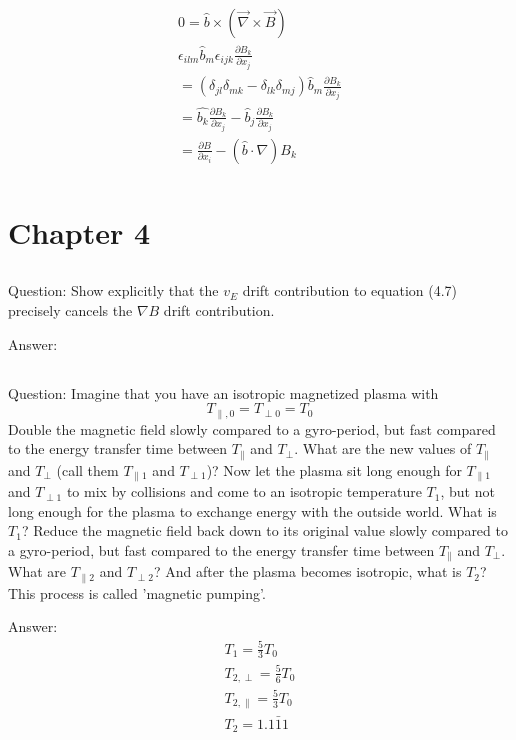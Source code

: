 \documentclass{article}
\begin{document}
\begin{eqnarray*}
    0=\hat{b}\times(\vec{\nabla}\times \vec{B})\\
    \epsilon_{ilm}\hat{b}_m\epsilon_{ijk}\frac{\partial B_k}{\partial x_j}\\
    =(\delta_{jl}\delta_{mk}-\delta_{lk}\delta_{mj})\hat{b}_m\frac{\partial B_k}{\partial x_j}\\
    =\hat{b_k}\frac{\partial B_k}{\partial x_j}-\hat{b}_j\frac{\partial B_k}{\partial x_j}\\
    =\frac{\partial B}{\partial x_i}-(\hat{b}\cdot\nabla)B_k\\
\end{eqnarray*}

\section{Chapter 4}
\subsection{}
Question: Show explicitly that the $v_E$ drift contribution to equation (4.7) precisely cancels the $\nabla B$ drift contribution.

Answer:

\subsection{}
Question: Imagine that you have an isotropic magnetized plasma with 
\begin{equation}
    T_{\parallel,0}=T_{\perp 0}=T_0
\end{equation}
Double the magnetic field slowly compared to a gyro-period, but fast compared to the energy transfer time between $T_\parallel$ and $T_\perp$. 
What are the new values of $T_\parallel$ and $T_\perp$ (call them $T_{\parallel 1}$ and $T_{\perp 1}$)? Now let the plasma sit long enough for $T_{\parallel 1}$ and $T_{\perp 1}$ to mix
by collisions and come to an isotropic temperature $T_1$, but not long enough for the plasma to exchange energy with the outside world. What is $T_1$? Reduce the magnetic field back down to its original 
value slowly compared to a gyro-period, but fast compared to the energy transfer time between $T_{\parallel}$ and $T_\perp$. What are $T_{\parallel 2}$ and $T_{\perp 2}$? And after the plasma becomes isotropic, what is 
$T_2$? This process is called 'magnetic pumping'. 

Answer: 
\begin{eqnarray*}
    T_1=\frac{5}{3}T_0\\
    T_{2,\perp}=\frac{5}{6}T_0\\
    T_{2,\parallel}=\frac{5}{3}T_0\\
    T_2=1.\bar{111}\\
\end{eqnarray*}
\end{document}
